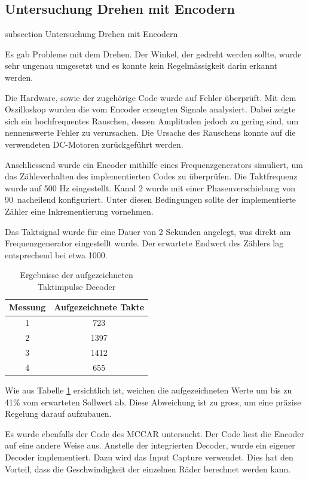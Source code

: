 \newpage
\subsection*{Untersuchung Drehen mit Encodern}\label{drehen-encoder}
    {subsection}
    {Untersuchung Drehen mit Encodern}

Es gab Probleme mit dem Drehen. Der Winkel, der gedreht werden sollte, wurde sehr ungenau umgesetzt und es konnte kein Regelmässigkeit darin erkannt werden.

Die Hardware, sowie der zugehörige Code wurde auf Fehler überprüft. Mit dem Oszilloskop wurden die vom Encoder erzeugten Signale analysiert. Dabei zeigte sich ein hochfrequentes Rauschen, dessen Amplituden jedoch zu gering sind, um nennenswerte Fehler zu verursachen. Die Ursache des Rauschens konnte auf die verwendeten DC-Motoren zurückgeführt werden.

Anschliessend wurde ein Encoder mithilfe eines Frequenzgenerators simuliert, um das Zähleverhalten des implementierten Codes zu überprüfen. Die Taktfrequenz wurde auf 500 Hz eingestellt. Kanal 2 wurde mit einer Phasenverschiebung von 90\textdegree \ nacheilend konfiguriert. Unter diesen Bedingungen sollte der implementierte Zähler eine Inkrementierung vornehmen.

Das Taktsignal wurde für eine Dauer von 2 Sekunden angelegt, was direkt am Frequenzgenerator eingestellt wurde. Der erwartete Endwert des Zählers lag entsprechend bei etwa 1000.

\begin{table}[H]
\centering
\caption{Ergebnisse der aufgezeichneten Taktimpulse Decoder}
\label{tab:taktergebnisse_de}
\begin{tabular}{|c|c|}
\hline
\textbf{Messung} & \textbf{Aufgezeichnete Takte} \\
\hline
1 & 723 \\
2 & 1397 \\
3 & 1412 \\
4 & 655 \\
\hline
\end{tabular}
\end{table}

Wie aus Tabelle \ref{tab:taktergebnisse_de} ersichtlich ist, weichen die aufgezeichneten Werte um bis zu 41\% vom erwarteten Sollwert ab. Diese Abweichung ist zu gross, um eine präzise Regelung darauf aufzubauen.

Es wurde ebenfalls der Code des MCCAR untersucht. Der Code liest die Encoder auf eine andere Weise aus. Anstelle der integrierten Decoder, wurde ein eigener Decoder implementiert. Dazu wird das Input Capture verwendet. Dies hat den Vorteil, dass die Geschwindigkeit der einzelnen Räder berechnet werden kann.

